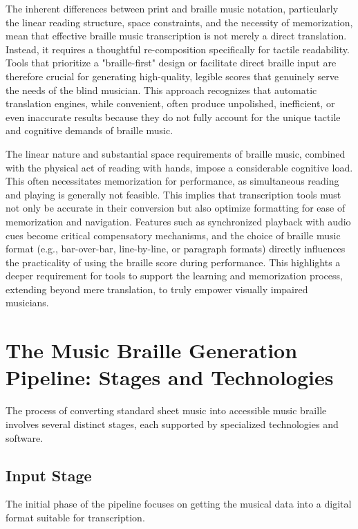 The inherent differences between print and braille music notation, particularly the linear reading structure, space constraints, and the necessity of memorization, mean that effective braille music transcription is not merely a direct translation. Instead, it requires a thoughtful re-composition specifically for tactile readability. Tools that prioritize a "braille-first" design or facilitate direct braille input are therefore crucial for generating high-quality, legible scores that genuinely serve the needs of the blind musician. \cite{pathstoliteracy-notator} This approach recognizes that automatic translation engines, while convenient, often produce unpolished, inefficient, or even inaccurate results because they do not fully account for the unique tactile and cognitive demands of braille music. \cite{pathstoliteracy-notator}

The linear nature and substantial space requirements of braille music, combined with the physical act of reading with hands, impose a considerable cognitive load. This often necessitates memorization for performance, as simultaneous reading and playing is generally not feasible. \cite{rnib-braille-music} This implies that transcription tools must not only be accurate in their conversion but also optimize formatting for ease of memorization and navigation. Features such as synchronized playback with audio cues become critical compensatory mechanisms, and the choice of braille music format (e.g., bar-over-bar, line-by-line, or paragraph formats) directly influences the practicality of using the braille score during performance. \cite{dancingdots-goodfeel} This highlights a deeper requirement for tools to support the learning and memorization process, extending beyond mere translation, to truly empower visually impaired musicians.

\section{The Music Braille Generation Pipeline: Stages and Technologies}\label{sec:music-braille-pipeline}
The process of converting standard sheet music into accessible music braille involves several distinct stages, each supported by specialized technologies and software.

\subsection{Input Stage}\label{subsec:music-input-stage}
The initial phase of the pipeline focuses on getting the musical data into a digital format suitable for transcription.

